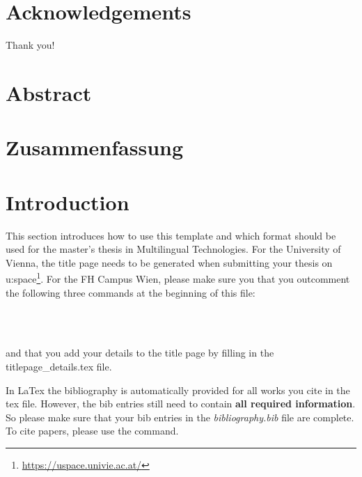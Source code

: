 \documentclass[a4paper,fontsize=12pt,listof=totoc,bibliography=totoc]{scrbook}
\begin{document}

% 

%


\chapter*{Acknowledgements}
Thank you! 

\chapter*{Abstract}
\chapter*{Zusammenfassung}

	
\thispagestyle{empty}
\tableofcontents{}
\listoftables 
\listoffigures


\mainmatter{}

\chapter{Introduction}
This section introduces how to use this template and which format should be used for the master's thesis in Multilingual Technologies. For the University of Vienna, the title page needs to be generated when submitting your thesis on u:space\footnote{\url{https://uspace.univie.ac.at/}}. For the FH Campus Wien, please make sure you that you outcomment the following three commands at the beginning of this file:

\begin{verbatim}

 

\end{verbatim}

and that you add your details to the title page by filling in the titlepage\_details.tex file. 

In LaTex the bibliography is automatically provided for all works you cite in the tex file. However, the bib entries still need to contain \textbf{all required information}. So please make sure that your bib entries in the \textit{bibliography.bib} file are complete.  To cite papers, please use the \citep{jurafskyspeech} command. 
\end{document}
